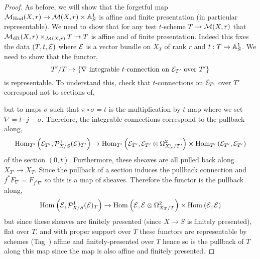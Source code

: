 \documentclass[12pt]{article}
\begin{document}
\begin{proof}
As before, we will show that the forgetful map $\mathcal{M}_{\mathrm{Hod}}(X, r) \to \mathcal{M}(X, r) \times \mathbb{A}^1_S$ is affine and finite presentation (in particular representable). 
We need to show that for any test $t$-scheme $T \to \mathcal{M}(X, r)$ that $\mathcal{M}_{\mathrm{dR}}(X, r) \times_{\mathcal{M}(X, r)} T \to T$ is affine and of finite presentation. Indeed this fixes the data $(T, t, \mathcal{E})$ where $\mathcal{E}$ is a vector bundle on $X_T$ of rank $r$ and $t : T \to \mathbb{A}^1_S$. We need to show that the functor,
\[ T'/T \mapsto \{ \nabla \text{ integrable } t\text{-connection on } \mathcal{E}_{T'} \text{ over } T' \} \]
is representable. To understand this, check that $t$-connections on $\mathcal{E}_{T'}$ over $T'$ correspond not to sections of,
\begin{center}
\end{center}
but to maps $\sigma$ such that $\pi \circ \sigma = t$ is the multiplication by $t$ map 
where we set $\nabla = t \cdot j - \sigma$.  Therefore, the integrable connections correspond to the pullback along,
\[ \mathrm{Hom}_{T'} \left( \mathcal{E}_{T'}, \mathcal{P}^1_{X/S}(\mathcal{E})_{T'} \right) \to \mathrm{Hom}_{T'} \left( \mathcal{E}_{T'}, \mathcal{E}_{T'} \otimes \Omega^2_{X'_T/T'} \right) \times \mathrm{Hom}_{T'} \left( \mathcal{E}_{T'}, \mathcal{E}_{T'} \right) \]
of the section $(0, t)$. Furthermore, these sheaves are all pulled back along $X_{T'} \to X_T$. Since the pullback of a section induces the pullback connection and $f^* F_{\nabla} = F_{f^* \nabla}$ so this is a map of sheaves. Therefore the functor is the pullback along,
\[ \mathrm{Hom}_{} \left( \mathcal{E}, \mathcal{P}^1_{X/S}(\mathcal{E})_{T} \right) \to \mathrm{Hom}_{} \left( \mathcal{E}, \mathcal{E} \otimes \Omega^2_{X_T/T} \right) \times \mathrm{Hom}_{} \left( \mathcal{E}, \mathcal{E} \right) \]
but since these sheaves are finitely presented (since $X \to S$ is finitely presented), flat over $T$, and with proper support over $T$ these functors are representable by schemes (Tag~) affine and finitely-presented over $T$ hence so is the pullback of $T$ along this map since the map is also affine and finitely presented.
\end{proof}
\end{document}
